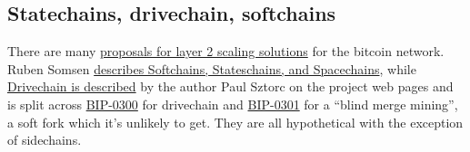 \subsection{Statechains, drivechain, softchains} 
There are many \href{https://gist.github.com/RubenSomsen/96505e99dc061d6af6b757ff74434e70}{proposals for layer 2 scaling solutions} for the bitcoin network. Ruben Somsen \href{https://gist.github.com/RubenSomsen/c9f0a92493e06b0e29acced61ca9f49a}{describes Softchains, Stateschains, and Spacechains}, while  \href{https://www.drivechain.info/literature/index.html}{Drivechain is described} by the author Paul Sztorc on the project web pages and is split across \href{https://github.com/bitcoin/bips/blob/master/bip-0300.mediawiki}{BIP-0300} for drivechain and \href{https://github.com/bitcoin/bips/blob/master/bip-0301.mediawiki}{BIP-0301} for a ``blind merge mining'', a soft fork which it's unlikely to get. They are all hypothetical with the exception of sidechains.  

